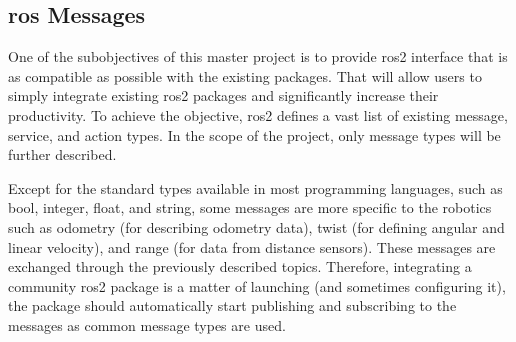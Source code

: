 

\subsection{\ac{ros} Messages}
One of the subobjectives of this master project is to provide \ac{ros2} interface that is as compatible as possible with the existing packages.
That will allow users to simply integrate existing \ac{ros2} packages and significantly increase their productivity.
To achieve the objective, \ac{ros2} defines a vast list of existing message, service, and action types.
In the scope of the project, only message types will be further described.

Except for the standard types available in most programming languages, such as bool, integer, float, and string, some messages are more specific to the robotics such as odometry (for describing odometry data), twist (for defining angular and linear velocity), and range (for data from distance sensors).
These messages are exchanged through the previously described topics.
Therefore, integrating a community \ac{ros2} package is a matter of launching (and sometimes configuring it), the package should automatically start publishing and subscribing to the messages as common message types are used.


